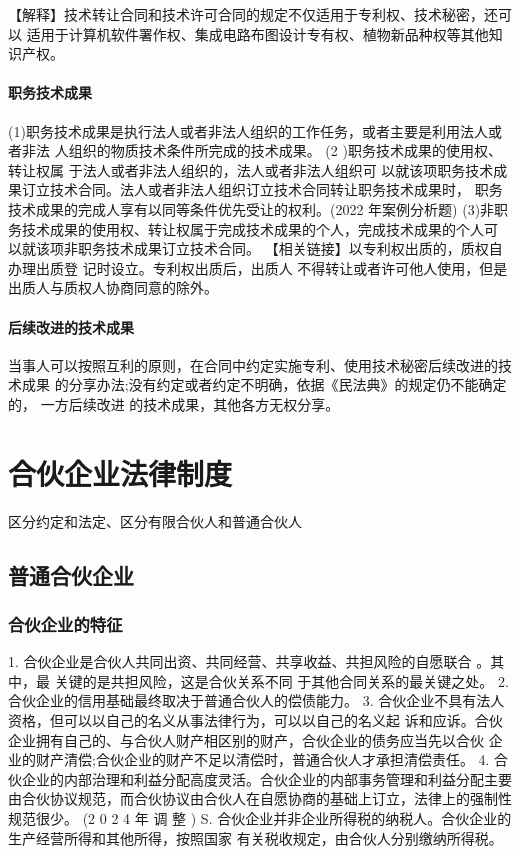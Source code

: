 \documentclass[UTF8,12pt]{ctexart}
\numberwithin{equation}{section} %
\numberwithin{figure}{section}
\numberwithin{table}{section}
\begin{document}
	【解释】技术转让合同和技术许可合同的规定不仅适用于专利权、技术秘密，还可以 适用于计算机软件署作权、集成电路布图设计专有权、植物新品种权等其他知识产权。
	
	\paragraph{职务技术成果} (1)职务技术成果是执行法人或者非法人组织的工作任务，或者主要是利用法人或者非法 人组织的物质技术条件所完成的技术成果。
	(2 )职务技术成果的使用权、转让权属 于法人或者非法人组织的，法人或者非法人组织可 以就该项职务技术成果订立技术合同。法人或者非法人组织订立技术合同转让职务技术成果时， 职务技术成果的完成人享有以同等条件优先受让的权利。(2022 年案例分析题) (3)非职务技术成果的使用权、转让权属于完成技术成果的个人，完成技术成果的个人可 以就该项非职务技术成果订立技术合同。
	【相关链接】以专利权出质的，质权自办理出质登 记时设立。专利权出质后，出质人 不得转让或者许可他人使用，但是出质人与质权人协商同意的除外。
	
	\paragraph{后续改进的技术成果} 当事人可以按照互利的原则，在合同中约定实施专利、使用技术秘密后续改进的技术成果 的分享办法;没有约定或者约定不明确，依据《民法典》的规定仍不能确定的， 一方后续改进 的技术成果，其他各方无权分享。

	
	\newpage
	\section{合伙企业法律制度}
	区分约定和法定、区分有限合伙人和普通合伙人
	
	
	\subsection{普通合伙企业}
	\subsubsection{合伙企业的特征} 
	1. 合伙企业是合伙人共同出资、共同经营、共享收益、共担风险的自愿联合 。其中，最 关键的是共担风险，这是合伙关系不同 于其他合同关系的最关键之处。
	2. 合伙企业的信用基础最终取决于普通合伙人的偿债能力。
	3. 合伙企业不具有法人资格，但可以以自己的名义从事法律行为，可以以自己的名义起 诉和应诉。合伙企业拥有自己的、与合伙人财产相区别的财产，合伙企业的债务应当先以合伙 企业的财产清偿;合伙企业的财产不足以清偿时，普通合伙人才承担清偿责任。
	4. 合伙企业的内部治理和利益分配高度灵活。合伙企业的内部事务管理和利益分配主要 由合伙协议规范，而合伙协议由合伙人在自愿协商的基础上订立，法律上的强制性规范很少。 (2 0 2 4 年 调 整 )
	S. 合伙企业并非企业所得税的纳税人。合伙企业的生产经营所得和其他所得，按照国家 有关税收规定，由合伙人分别缴纳所得税。
	
\end{document}
